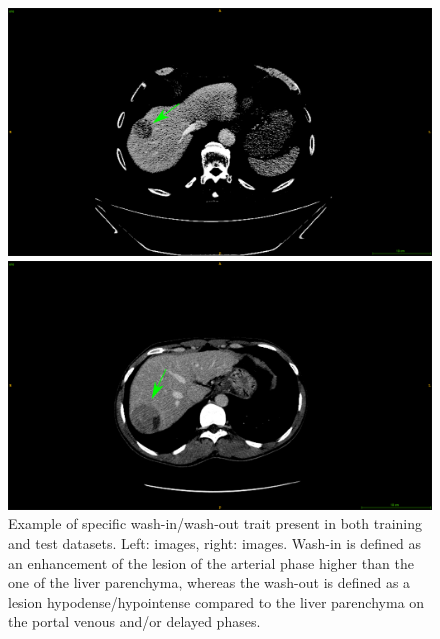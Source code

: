 {\begin{figure}[!ht]
\begin{mdframed}[backgroundcolor=blue!50,linecolor=blue!50]
\begin{minipage}{0.45\linewidth}
		\end{minipage} \\
		\begin{minipage}{0.45\linewidth}
			\includegraphics[width=\linewidth]{images/ImagingTraits/GDB_washout}
		\end{minipage} \hspace{-0.1cm}
		\begin{minipage}{0.45\linewidth}
			\includegraphics[width=\linewidth]{images/ImagingTraits/TCIA_washout}
		\end{minipage}
	\end{mdframed}
	\caption{Example of specific wash-in/wash-out trait present in both training and test datasets. Left: \textbf{} images, right: \textbf{} images.
	Wash-in is defined as an enhancement of the lesion of the arterial phase higher than the one of the liver parenchyma, whereas the wash-out is defined as a lesion hypodense/hypointense compared to the liver parenchyma on the portal venous and/or delayed phases.}
	\label{fig:InterDb_imagingTraits3}
\end{figure}
}
